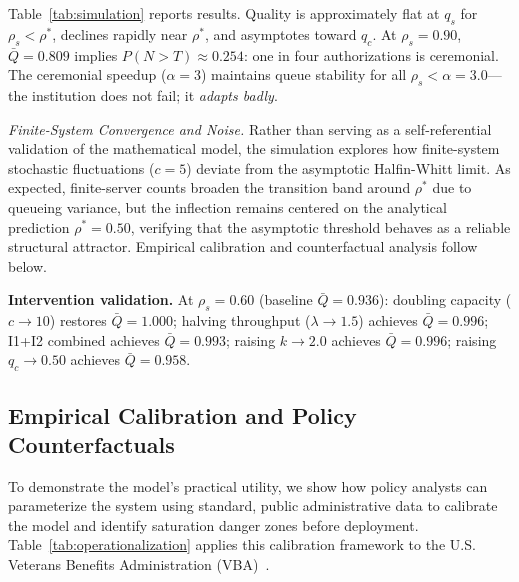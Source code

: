 \documentclass[runningheads]{llncs}
\begin{document}
Table~\ref{tab:simulation} reports results. Quality is approximately flat at $q_s$
for $\rho_s < \rho^*$, declines rapidly near $\rho^*$, and asymptotes toward $q_c$.
At $\rho_s = 0.90$, $\bar{Q} = 0.809$ implies $P(N > T) \approx 0.254$:
one in four authorizations is ceremonial.
The ceremonial speedup ($\alpha=3$) maintains queue stability for all
$\rho_s < \alpha = 3.0$---the institution does not fail; it \emph{adapts badly}.

\noindent\textit{Finite-System Convergence and Noise.} Rather than serving as a self-referential validation of the mathematical model, the simulation explores how finite-system stochastic fluctuations ($c = 5$) deviate from the asymptotic Halfin-Whitt limit. As expected, finite-server counts broaden the transition band around $\rho^*$ due to queueing variance, but the inflection remains centered on the analytical prediction $\rho^* = 0.50$, verifying that the asymptotic threshold behaves as a reliable structural attractor. Empirical calibration and counterfactual analysis follow below.

\noindent\textbf{Intervention validation.}
At $\rho_s = 0.60$ (baseline $\bar{Q} = 0.936$): doubling capacity ($c \to 10$) restores
$\bar{Q} = 1.000$; halving throughput ($\lambda \to 1.5$) achieves $\bar{Q} = 0.996$;
I1+I2 combined achieves $\bar{Q} = 0.993$; raising $k \to 2.0$ achieves
$\bar{Q} = 0.996$; raising $q_c \to 0.50$ achieves $\bar{Q} = 0.958$.

\subsection{Empirical Calibration and Policy Counterfactuals}
\label{sec:empirical}

To demonstrate the model's practical utility, we show how policy analysts can parameterize the system using standard, public administrative data to calibrate the model and identify saturation danger zones before deployment. Table~\ref{tab:operationalization} applies this calibration framework to the U.S. Veterans Benefits Administration (VBA)~\cite{va2024}.
\end{document}
